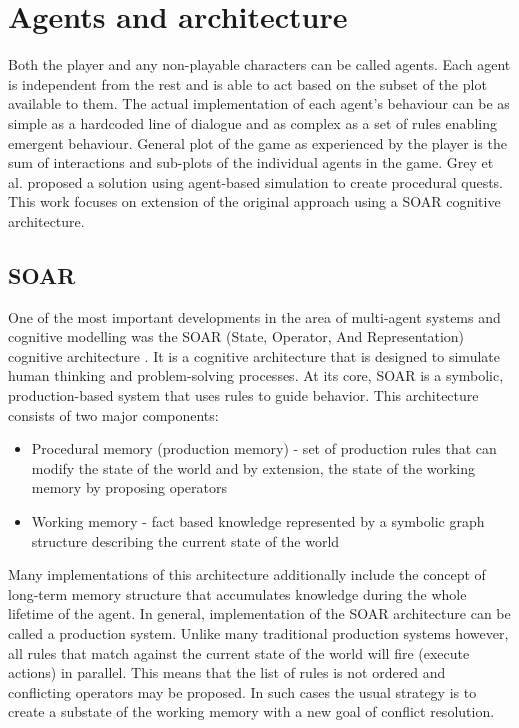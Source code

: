 
\section{Agents and architecture}

Both the player and any non-playable characters can be called agents.
Each agent is independent from the rest and is able to act based on the subset of the plot available to them.
The actual implementation of each agent's behaviour can be as simple as a hardcoded line of dialogue and as complex as a set of rules enabling emergent behaviour.
General plot of the game as experienced by the player is the sum of interactions and sub-plots of the individual agents in the game.
Grey et al.\cite{grey2011procedural} proposed a solution using agent-based simulation to create procedural quests.
This work focuses on extension of the original approach using a SOAR cognitive architecture\cite{rosenbloom1993soar}.

\subsection{SOAR}

One of the most important developments in the area of multi-agent systems and cognitive modelling was the SOAR (State, Operator, And Representation) cognitive architecture \cite{laird2019soar}.
It is a cognitive architecture that is designed to simulate human thinking and problem-solving processes.
At its core, SOAR is a symbolic, production-based system that uses rules to guide behavior.
This architecture consists of two major components:

\begin{itemize}
    \item Procedural memory (production memory) - set of production rules that can modify the state of the world and by extension, the state of the working memory by proposing operators
    \item Working memory - fact based knowledge represented by a symbolic graph structure describing the current state of the world
\end{itemize}

Many implementations of this architecture additionally include the concept of long-term memory structure that accumulates knowledge during the whole lifetime of the agent.
In general, implementation of the SOAR architecture can be called a production system.
Unlike many traditional production systems however, all rules that match against the current state of the world will fire (execute actions) in parallel.
This means that the list of rules is not ordered and conflicting operators may be proposed.
In such cases the usual strategy is to create a substate of the working memory with a new goal of conflict resolution.

